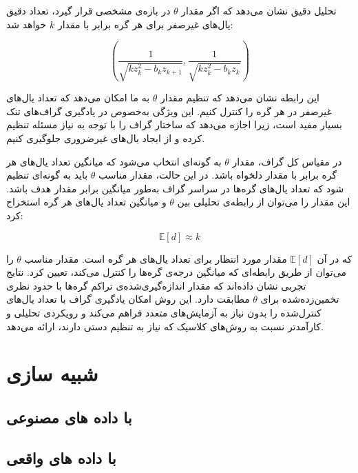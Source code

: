 \documentclass[10pt,twocolumn,a4paper]{article}
\begin{document}
	تحلیل دقیق نشان می‌دهد که اگر مقدار \( \theta \) در بازه‌ی مشخصی قرار گیرد، تعداد دقیق یال‌های غیرصفر برای هر گره برابر با مقدار \( k \) خواهد شد:
	
	\begin{equation}
		\left( \frac{1}{\sqrt{k z_k^2 - b_k z_{k+1}}}, \frac{1}{\sqrt{k z_k^2 - b_k z_k}} \right)
	\end{equation}
	
	این رابطه نشان می‌دهد که تنظیم مقدار \( \theta \) به ما امکان می‌دهد که تعداد یال‌های غیرصفر در هر گره را کنترل کنیم. این ویژگی به‌خصوص در یادگیری گراف‌های تنک بسیار مفید است، زیرا اجازه می‌دهد که ساختار گراف را با توجه به نیاز مسئله تنظیم کرده و از ایجاد یال‌های غیرضروری جلوگیری کنیم.
	
	در مقیاس کل گراف، مقدار \( \theta \) به گونه‌ای انتخاب می‌شود که میانگین تعداد یال‌های هر گره برابر با مقدار دلخواه باشد. در این حالت، مقدار مناسب \( \theta \) باید به گونه‌ای تنظیم شود که تعداد یال‌های گره‌ها در سراسر گراف به‌طور میانگین برابر مقدار هدف باشد. این مقدار را می‌توان از رابطه‌ی تحلیلی بین \( \theta \) و میانگین تعداد یال‌های هر گره استخراج کرد:
	
	\[
	\mathbb{E}[d] \approx k
	\]
	
	که در آن \( \mathbb{E}[d] \) مقدار مورد انتظار برای تعداد یال‌های هر گره است. مقدار مناسب \( \theta \) را می‌توان از طریق رابطه‌ای که میانگین درجه‌ی گره‌ها را کنترل می‌کند، تعیین کرد. نتایج تجربی نشان داده‌اند که مقدار اندازه‌گیری‌شده‌ی تراکم گره‌ها با حدود نظری تخمین‌زده‌شده برای \( \theta \) مطابقت دارد. این روش امکان یادگیری گراف با تعداد یال‌های کنترل‌شده را بدون نیاز به آزمایش‌های متعدد فراهم می‌کند و رویکردی تحلیلی و کارآمدتر نسبت به روش‌های کلاسیک که نیاز به تنظیم دستی دارند، ارائه می‌دهد.
	
	
	\section{شبیه سازی}
	
	
	\subsection{با داده های مصنوعی}
	
	\subsection{با داده های واقعی}
	
\end{document}

